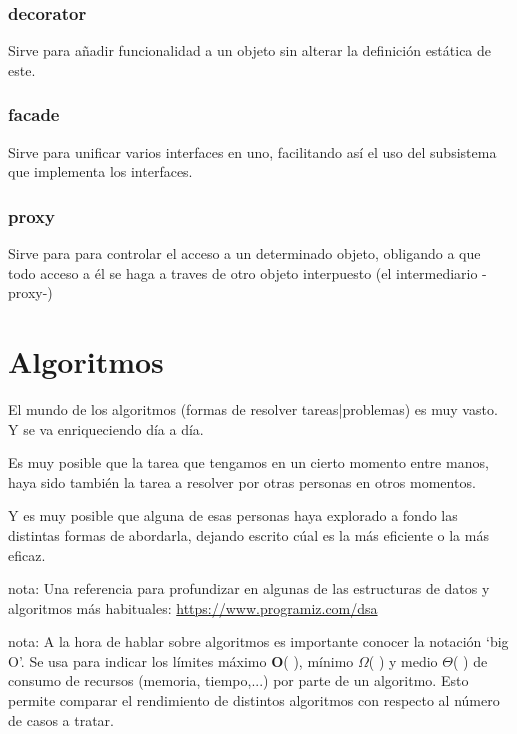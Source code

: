 \documentclass[spanish,12pt,a4paper,final,oneside]{book}
\begin{document}
\subsubsection{decorator}
Sirve para añadir funcionalidad a un objeto sin alterar la definición estática de este.
\subsubsection{facade}
Sirve para unificar varios interfaces en uno, facilitando así el uso del subsistema que implementa los interfaces.
\subsubsection{proxy}
Sirve para para controlar el acceso a un determinado objeto, obligando a que todo acceso a él se haga a traves de otro objeto interpuesto (el intermediario -proxy-)




\section{Algoritmos}

El mundo de los algoritmos (formas de resolver tareas|problemas) es muy vasto. Y se va enriqueciendo día a día.

Es muy posible que la tarea que tengamos en un cierto momento entre manos, haya sido también la tarea a resolver por otras personas en otros momentos.

Y es muy posible que alguna de esas personas haya explorado a fondo las distintas formas de abordarla, dejando escrito cúal es la más eficiente o la más eficaz.

\vspace{0.5cm}
nota: Una referencia para profundizar en algunas de las estructuras de datos y algoritmos más habituales: \url{https://www.programiz.com/dsa}

\vspace{0.5cm}
nota: A la hora de hablar sobre algoritmos es importante conocer la notación `big O'. Se usa para indicar los límites máximo \textbf{O}( ), mínimo \textbf{$\Omega$}( ) y medio \textbf{$\Theta$}( ) de consumo de recursos (memoria, tiempo,...) por parte de un algoritmo. Esto permite comparar el rendimiento de distintos algoritmos con respecto al número de casos a tratar.
\end{document}
